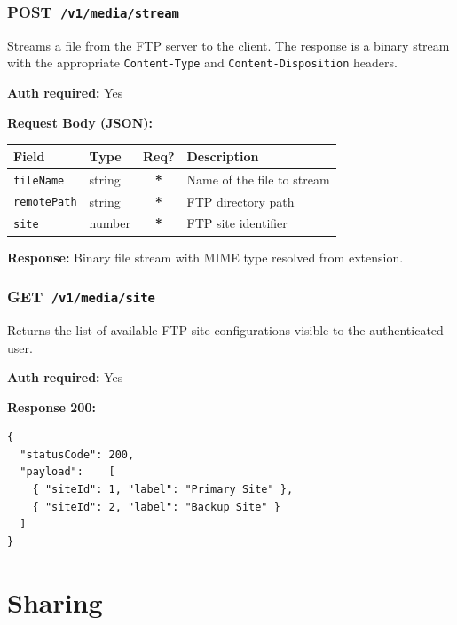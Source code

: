 \documentclass[12pt,a4paper]{article}
\newcommand{\httpget}[1]{%
  \colorbox{getcolor!20}{\textcolor{getcolor}{\textbf{\small GET}}}~\texttt{#1}%
}
\newcommand{\httppost}[1]{%
  \colorbox{postcolor!20}{\textcolor{postcolor}{\textbf{\small POST}}}~\texttt{#1}%
}
\newcommand{\required}{\textcolor{danger}{\textbf{*}}}
\begin{document}
\vspace{0.5em}
\subsubsection{\httppost{/v1/media/stream}}

Streams a file from the FTP server to the client. The response is a binary stream with the appropriate \texttt{Content-Type} and \texttt{Content-Disposition} headers.

\textbf{Auth required:} Yes

\textbf{Request Body (JSON):}

\begin{tabularx}{\linewidth}{llcX}
\toprule
\textbf{Field} & \textbf{Type} & \textbf{Req?} & \textbf{Description} \\
\midrule
\texttt{fileName}   & string & \required & Name of the file to stream \\
\texttt{remotePath} & string & \required & FTP directory path \\
\texttt{site}       & number & \required & FTP site identifier \\
\bottomrule
\end{tabularx}

\textbf{Response:} Binary file stream with MIME type resolved from extension.

\vspace{0.5em}
\subsubsection{\httpget{/v1/media/site}}

Returns the list of available FTP site configurations visible to the authenticated user.

\textbf{Auth required:} Yes

\textbf{Response 200:}
\begin{lstlisting}
{
  "statusCode": 200,
  "payload":    [
    { "siteId": 1, "label": "Primary Site" },
    { "siteId": 2, "label": "Backup Site" }
  ]
}
\end{lstlisting}

\newpage

\section{Sharing}
\end{document}
